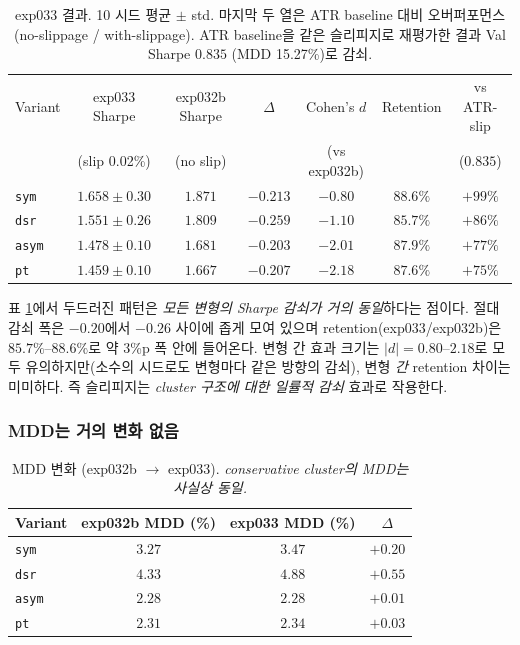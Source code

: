 \documentclass[11pt, a4paper]{article}
\begin{document}
\begin{table}[!htbp]
\centering
\small
\caption{exp033 결과. 10 시드 평균 $\pm$ std. 마지막 두 열은 ATR baseline 대비
오버퍼포먼스(no-slippage / with-slippage). ATR baseline을 같은 슬리피지로
재평가한 결과 Val Sharpe $0.835$ (MDD 15.27\%)로 감쇠.}
\begin{tabular}{lcccccc}
\toprule
Variant & exp033 Sharpe & exp032b Sharpe & $\Delta$ & Cohen's $d$ & Retention & vs ATR-slip \\
 & (slip 0.02\%) & (no slip) & & (vs exp032b) & & ($0.835$) \\
\midrule
\texttt{sym}  & $1.658 \pm 0.30$ & $1.871$ & $-0.213$ & $-0.80$ & $88.6\%$ & $+99\%$ \\
\texttt{dsr}  & $1.551 \pm 0.26$ & $1.809$ & $-0.259$ & $-1.10$ & $85.7\%$ & $+86\%$ \\
\texttt{asym} & $1.478 \pm 0.10$ & $1.681$ & $-0.203$ & $-2.01$ & $87.9\%$ & $+77\%$ \\
\texttt{pt}   & $1.459 \pm 0.10$ & $1.667$ & $-0.207$ & $-2.18$ & $87.6\%$ & $+75\%$ \\
\bottomrule
\end{tabular}
\label{tab:slippage_per_variant}
\end{table}

표 \ref{tab:slippage_per_variant}에서 두드러진 패턴은 \emph{모든 변형의 Sharpe
감쇠가 거의 동일}하다는 점이다. 절대 감쇠 폭은 $-0.20$에서 $-0.26$ 사이에 좁게
모여 있으며 retention(exp033/exp032b)은 $85.7\%$--$88.6\%$로 약 3\%p 폭 안에
들어온다. 변형 간 효과 크기는 $|d| = 0.80$--$2.18$로 모두 유의하지만(소수의 시드로도
변형마다 같은 방향의 감쇠), 변형 \emph{간} retention 차이는 미미하다. 즉
슬리피지는 \emph{cluster 구조에 대한 일률적 감쇠} 효과로 작용한다.

\subsubsection{MDD는 거의 변화 없음}
\label{sec:slippage_mdd}

\begin{table}[!htbp]
\centering
\caption{MDD 변화 (exp032b $\to$ exp033). \textit{conservative cluster의 MDD는
사실상 동일.}}
\begin{tabular}{lccc}
\toprule
Variant & exp032b MDD (\%) & exp033 MDD (\%) & $\Delta$ \\
\midrule
\texttt{sym}  & $3.27$ & $3.47$ & $+0.20$ \\
\texttt{dsr}  & $4.33$ & $4.88$ & $+0.55$ \\
\texttt{asym} & $2.28$ & $2.28$ & $+0.01$ \\
\texttt{pt}   & $2.31$ & $2.34$ & $+0.03$ \\
\bottomrule
\end{tabular}
\label{tab:slippage_mdd}
\end{table}
\end{document}
